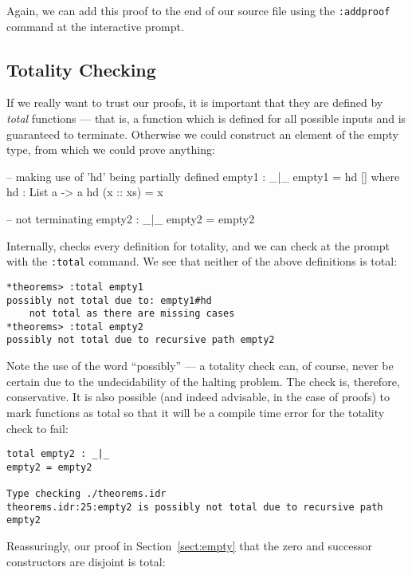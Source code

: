 \noindent
Again, we can add this proof to the end of our source file using the \texttt{:addproof} command at the interactive prompt.

\subsection{Totality Checking}
\label{sect:totality}

If we really want to trust our proofs, it is important that they are defined by \emph{total} functions --- that is, a function which is defined for all possible inputs and is guaranteed to terminate.
Otherwise we could construct an element of the empty type, from which we could prove anything:

\begin{code}
-- making use of 'hd' being partially defined
empty1 : _|_
empty1 = hd [] where
    hd : List a -> a
    hd (x :: xs) = x

-- not terminating
empty2 : _|_
empty2 = empty2
\end{code}

\noindent
Internally, \Idris{} checks every definition for totality, and we can check at the prompt with the \texttt{:total} command.
We see that neither of the above definitions is total:

\begin{lstlisting}[style=stdout]
*theorems> :total empty1
possibly not total due to: empty1#hd
	not total as there are missing cases
*theorems> :total empty2
possibly not total due to recursive path empty2
\end{lstlisting}

\noindent
Note the use of the word ``possibly'' --- a totality check can, of course, never be certain due to the undecidability of the halting problem.
The check is, therefore, conservative.
It is also possible (and indeed advisable, in the case of proofs) to mark functions as total so that it will be a compile time error for the totality check to fail:

\begin{lstlisting}[style=stdout]
total empty2 : _|_
empty2 = empty2

Type checking ./theorems.idr
theorems.idr:25:empty2 is possibly not total due to recursive path empty2
\end{lstlisting}

\noindent
Reassuringly, our proof in Section~\ref{sect:empty} that the zero and successor constructors are disjoint is total:

